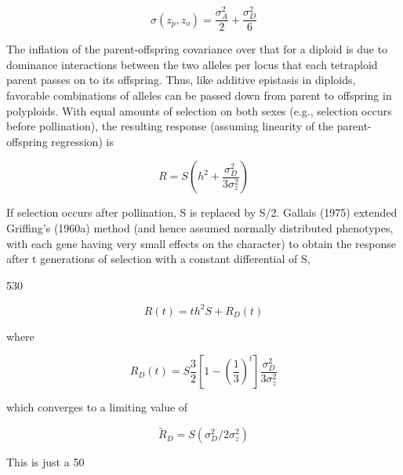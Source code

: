 \documentclass{article}
\begin{document}
\begin{equation}
\sigma(z_{p},z_{o})=\frac{\sigma_{A}^{2}}{2}+\frac{\sigma_{D}^{2}}{6}
\end{equation}

The inflation of the parent-offspring covariance over that for a diploid is due to dominance interactions between the two alleles per locus that each tetraploid parent passes on to its offspring. Thus, like additive epistasis in diploids, favorable combinations of alleles can be passed down from parent to offspring in polyploids. With equal amounts of selection on both sexes (e.g., selection occurs before pollination), the resulting response (assuming linearity of the parent-offspring regression) is

\begin{equation}
R=S\left(h^{2}+\frac{\sigma_{D}^{2}}{3\sigma_{z}^{2}}\right)
\tag{15.9}
\label{eq:15_9}
\end{equation}

If selection occurs after pollination, S is replaced by S/2. Gallais (1975) extended Griffing's (1960a) method (and hence assumed normally distributed phenotypes, with each gene having very small effects on the character) to obtain the response after t generations of selection with a constant differential of S,

530

\begin{equation}
R(t)=t h^{2}S+R_{D}(t)
\tag{15.10a}
\label{eq:15_10a}
\end{equation}

where

\begin{equation}
R_{D}(t)=S\frac{3}{2}\left[1-\left(\frac{1}{3}\right)^{t}\right]\frac{\sigma_{D}^{2}}{3\sigma_{z}^{2}}
\tag{15.10b}
\label{eq:15_10b}
\end{equation}

which converges to a limiting value of

\begin{equation}
\widetilde{R}_{D}=S\left(\sigma_{D}^{2}/2\sigma_{z}^{2}\right)
\tag{15.10c}
\label{eq:15_10c}
\end{equation}

This is just a 50%
\end{document}
